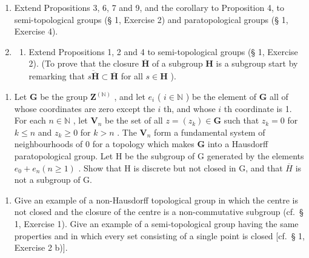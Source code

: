 \BourbakiExerciseGroup

\begin{enumerate}
\def\labelenumi{\arabic{enumi})}
\item
  Extend Propositions 3, 6, 7 and 9, and the corollary to Proposition 4, to semi-topological groups (§ 1, Exercise 2) and paratopological groups (§ 1, Exercise 4).
\item
  \begin{enumerate}
  \def\labelenumii{\alph{enumii})}
  \tightlist
  \item
    Extend Propositions 1, 2 and 4 to semi-topological groups (§ 1, Exercise 2). (To prove that the closure \(\overline{\mathbf{H}}\) of a subgroup \(\mathbf{H}\) is a subgroup start by remarking that \(\overline{s\overline{\mathbf{H}}} \subset \overline{\mathbf{H}}\) for all \(s \in \mathbf{H}\) ).
  \end{enumerate}
\end{enumerate}

\begin{enumerate}
\def\labelenumi{\alph{enumi})}
\setcounter{enumi}{1}
\tightlist
\item
  Let \(\mathbf{G}\) be the group \(\mathbf{Z}^{(\mathbb{N})}\) , and let \(e_i\) ( \(i \in \mathbb{N}\) ) be the element of \(\mathbf{G}\) all of whose coordinates are zero except the \(i\) th, and whose \(i\) th coordinate is 1. For each \(n \in \mathbb{N}\) , let \(\mathbf{V}_n\) be the set of all \(z = (z_k) \in \mathbf{G}\) such that \(z_k = 0\) for \(k \leqslant n\) and \(z_k \geqslant 0\) for \(k > n\) . The \(\mathbf{V}_n\) form a fundamental system of neighbourhoods of \(0\) for a topology which makes \(\mathbf{G}\) into a Hausdorff paratopological group. Let H be the subgroup of G generated by the elements \(e_{0} + e_{n} (n \geqslant 1)\) . Show that H is discrete but not closed in G, and that \(\overline{H}\) is not a subgroup of G.
\end{enumerate}

\begin{enumerate}
\def\labelenumi{\arabic{enumi})}
\setcounter{enumi}{2}
\tightlist
\item
  Give an example of a non-Hausdorff topological group in which the centre is not closed and the closure of the centre is a non-commutative subgroup (cf.~§ 1, Exercise 1). Give an example of a semi-topological group having the same properties and in which every set consisting of a single point is closed {[}cf.~§ 1, Exercise 2 b){]}.
\end{enumerate}

